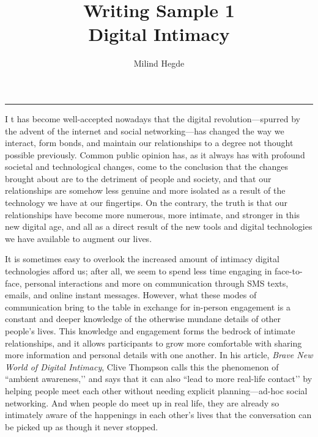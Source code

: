 \documentclass[11pt,a4paper]{article}
\title{\Large{Writing Sample 1}\\\bigskip \vspace{0.1cm}\huge{\color{spot}Digital Intimacy}\vspace{-0.2cm}}
\author{Milind Hegde}
\date{}
\begin{document}
\fontsize{11.25}{18}\selectfont
\setlength{\parskip}{0.15cm plus4mm minus3mm}
\maketitle

\begin{center}
\textcolor{spot}{\rule[2cm]{\textwidth}{1.5pt}}
\vspace*{-2.4cm}
\end{center}

\lettrine[lines=2, findent = 1pt, nindent = 3pt, loversize=0.05]{I}{} t has become well-accepted nowadays that the digital revolution---spurred by the advent of the internet and social networking---has changed the way we interact, form bonds, and maintain our relationships to a degree not thought possible previously. Common public opinion has, as it always has with profound societal and technological changes, come to the conclusion that the changes brought about are to the detriment of people and society, and that our relationships are somehow less genuine and more isolated as a result of the technology we have at our fingertips. On the contrary, the truth is that our relationships have become more numerous, more intimate, and stronger in this new digital age, and all as a direct result of the new tools and digital technologies we have available to augment our lives.

It is sometimes easy to overlook the increased amount of intimacy digital technologies afford us; after all, we seem to spend less time engaging in face-to-face, personal interactions and more on communication through SMS texts, emails, and online instant messages.  However, what these modes of communication bring to the table in exchange for in-person engagement is a constant and deeper knowledge of the otherwise mundane details of other people's lives. This knowledge and engagement forms the bedrock of intimate relationships, and it allows participants to grow more comfortable with sharing more information and personal details with one another. In his article, \emph{ Brave New World of Digital Intimacy}\cite{nyt}, Clive Thompson calls this the phenomenon of ``ambient awareness,’’ and says that it can also ``lead to more real-life contact’’ by helping people meet each other without needing explicit planning---ad-hoc social networking. And when people do meet up in real life, they are already so intimately aware of the happenings in each other's lives that the conversation can be picked up as though it never stopped.
\end{document}
